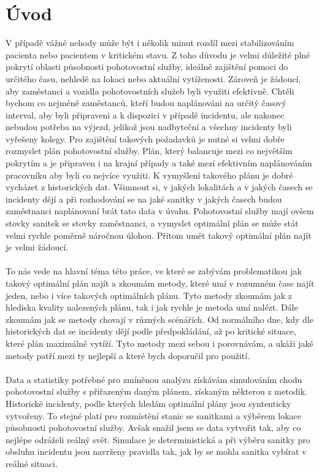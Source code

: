 \chapter*{Úvod}

V případě vážné nehody může být i několik minut rozdíl mezi stabilizováním pacienta nebo pacientem v kritickém stavu.
Z toho důvodu je velmi důležité plné pokrytí oblasti působnosti pohotovostní služby, ideálně zajištění pomoci do určitého času, nehledě na lokaci nebo aktuální vytíženosti.
Zároveň je žádoucí, aby zaměstanci a vozidla pohotovostních služeb byli využiti efektivně.
Chtěli bychom co nejméně zaměstanců, kteří budou naplánováni na určitý časový interval, aby byli připraveni a k dispozici v případě incidentu,
ale nakonec nebudou potřeba na výjezd, jelikož jsou nadbyteční a všechny incidenty byli vyřešeny kolegy.
Pro zajištění takových požadavků je nutné si velmi dobře rozmyslet plán pohotovostní služby.
Plán, který balancuje mezi co největším pokrytím a je připraven i na krajní případy a také mezí efektivním naplánováním pracovníku aby byli co nejvíce využiti.
K vymyšlení takového plánu je dobré vycházet z historických dat.
Všimnout si, v jakých lokalitách a v jakých časech se incidenty dějí a při rozhodování se na jaké sanitky v jakých časech budou
zaměstnanci naplánovaní brát tato data v úvahu.
Pohotovostní služby mají ovšem stovky sanitek se stovky zaměstnanci, a vymyslet optimální plán se může stát velmi rychle poměrně náročnou úlohou.
Přitom umět takový optimální plán najít je velmi žádoucí.
\\\\
To nás vede na hlavní téma této práce, ve které se zabývám problematikou jak takový optimální plán najít a zkoumám metody,
které umí v rozumném čase najít jeden, nebo i více takových optimálních plánu.
Tyto metody zkoumám jak z hlediska kvality nalezených plánu, tak i jak rychle je metoda umí nalézt.
Dále zkoumám jak se metody chovají v různých scénářích.
Od normálního dne, kdy dle historických dat se incidenty dějí podle předpokládání, až po kritické situace, které plán maximálně vytíží.
Tyto metody mezi sebou i porovnávám, a ukáži jaké metody patří mezi ty nejlepší a které bych doporučil pro použití.
\\\\
Data a statistiky potřebné pro zmíněnou analýzu získávám simulováním chodu pohotovostní služby s přiřazeným daným plánem, získaným některou z metodik.
Historické incidenty, podle kterých hledám optimální plány jsou syntenticky vytvořeny.
To stejné platí pro rozmístění stanic se sanitkami a výběrem lokace působnosti pohotovostní služby.
Avšak snažil jsem se data vytvořit tak, aby co nejlépe odráželi reálný svět.
Simulace je deterministická a při výběru sanitky pro obsluhu incidentu jsou navrženy pravidla tak, jak by se mohla sanitka vybírat v reálné situaci.

